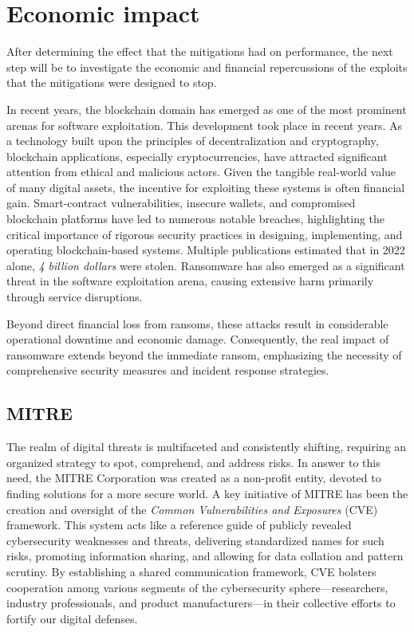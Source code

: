 \documentclass{article}
\begin{document}
\section{Economic impact}%
After determining the effect that the mitigations had on performance, the next step will be to investigate the economic and financial repercussions of the exploits that the mitigations were designed to stop. 

In recent years, the blockchain domain has emerged as one of the most prominent arenas for software exploitation. This development took place in recent years. As a technology built upon the principles of decentralization and cryptography, blockchain applications, especially cryptocurrencies, have attracted significant attention from ethical and malicious actors. Given the tangible real-world value of many digital assets, the incentive for exploiting these systems is often financial gain. Smart-contract vulnerabilities, insecure wallets, and compromised blockchain platforms have led to numerous notable breaches, highlighting the critical importance of rigorous security practices in designing, implementing, and operating blockchain-based systems. Multiple publications estimated that in 2022 alone, \emph{4 billion dollars} were stolen. Ransomware has also emerged as a significant threat in the software exploitation arena, causing extensive harm primarily through service disruptions.

Beyond direct financial loss from ransoms, these attacks result in considerable operational downtime and economic damage. Consequently, the real impact of ransomware extends beyond the immediate ransom, emphasizing the necessity of comprehensive security measures and incident response strategies.

\subsection{MITRE}
The realm of digital threats is multifaceted and consistently shifting, requiring an organized strategy to spot, comprehend, and address risks. In answer to this need, the MITRE Corporation was created as a non-profit entity, devoted to finding solutions for a more secure world. A key initiative of MITRE has been the creation and oversight of the \emph{Common Vulnerabilities and Exposures} (CVE) framework. This system acts like a reference guide of publicly revealed cybersecurity weaknesses and threats, delivering standardized names for such risks, promoting information sharing, and allowing for data collation and pattern scrutiny. By establishing a shared communication framework, CVE bolsters cooperation among various segments of the cybersecurity sphere—researchers, industry professionals, and product manufacturers—in their collective efforts to fortify our digital defenses.
\end{document}
